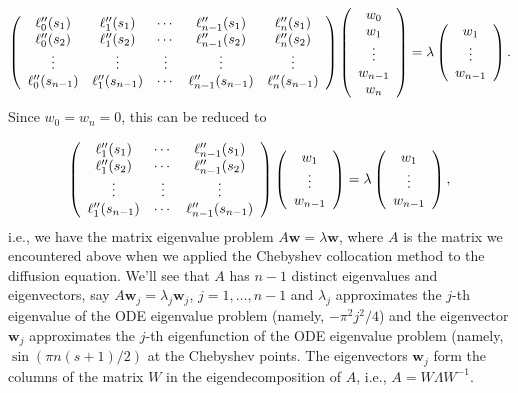 \documentclass[12pt,landscape]{article}
\begin{document}
{\[
\left(
\begin{array}{c c c c c}
\ell''_0(s_1) &\ell''_1(s_1) & \cdots &\ell''_{n-1}(s_1) & \ell''_{n}(s_1) \\
\ell''_0(s_2) &\ell''_1(s_2) & \cdots &\ell''_{n-1}(s_2) & \ell''_{n}(s_2)  \\
     \vdots  & \vdots & \vdots & \vdots & \vdots  \\
\ell''_0(s_{n-1}) &\ell''_1(s_{n-1}) & \cdots &\ell''_{n-1}(s_{n-1}) & \ell''_{n}(s_{n-1})
\end{array} 
\right)\left(
\begin{array}{c}
w_0 \\
w_1 \\
\vdots \\
w_{n-1} \\
w_n
\end{array}
\right) = \lambda
\left(
\begin{array}{c}
w_1 \\
\vdots \\
w_{n-1} 
\end{array}
\right).
\]
Since $w_0=w_n=0$, this can be reduced to

\[
\left(
\begin{array}{ c c c }
\ell''_1(s_1) & \cdots &\ell''_{n-1}(s_1)  \\
\ell''_1(s_2) & \cdots &\ell''_{n-1}(s_2)   \\
    \vdots & \vdots & \vdots  \\
\ell''_1(s_{n-1}) & \cdots &\ell''_{n-1}(s_{n-1}) 
\end{array} 
\right)\left(
\begin{array}{c}
w_1 \\
\vdots \\
w_{n-1} 
\end{array}
\right) = \lambda
\left(
\begin{array}{c}
w_1 \\
\vdots \\
w_{n-1} 
\end{array}
\right),
\]
i.e., we have the matrix eigenvalue problem $A\mathbf{w} = \lambda\mathbf{w}$, where $A$ is the matrix we encountered above when we applied the Chebyshev collocation method to the diffusion equation. We'll see that $A$ has $n-1$ distinct eigenvalues and eigenvectors, say $A\mathbf{w}_j = \lambda_j \mathbf{w}_j$, $j = 1, \ldots, n-1$ and $\lambda_j$ approximates the $j$-th eigenvalue of the ODE eigenvalue problem (namely, $-\pi^2j^2/4$) and the eigenvector $\mathbf{w}_j$ approximates the $j$-th eigenfunction of the ODE eigenvalue problem (namely, $\sin(\pi n(s +1)/2)$ at the Chebyshev points.  The eigenvectors $\mathbf{w}_j$ form the columns of the matrix $W$ in the eigendecomposition of $A$, i.e., $A = W\Lambda W^{-1}$.


}
\end{document}
